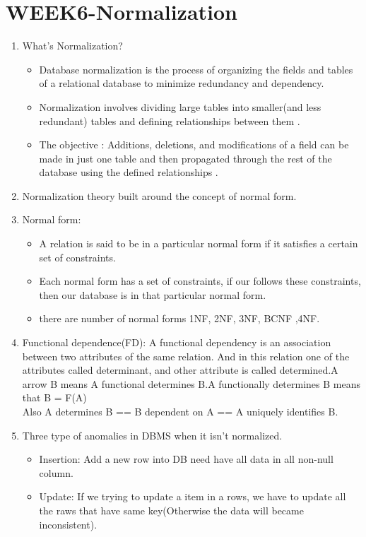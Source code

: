\pagebreak
\section{WEEK6-Normalization}
\begin{enumerate}
    \item What's Normalization? 
    \begin{itemize}
        \item Database normalization is the process of organizing the fields and tables of a relational database to minimize redundancy and dependency.
        \item Normalization involves dividing large tables into smaller(and less redundant) tables and defining relationships between them .
        \item The objective : Additions, deletions, and modifications of a field can be made in just one table and then propagated through the rest of the database using the defined relationships .
    \end{itemize}
    \item Normalization theory built around the concept of normal form.
    \item Normal form:
    \begin{itemize}
        \item A relation is said to be in a particular normal form if it satisfies a certain set of constraints.
        \item Each normal form has a set of constraints, if our follows these constraints, then our database is in that particular normal form.
        \item there are number of normal forms 1NF, 2NF, 3NF, BCNF ,4NF.
    \end{itemize}
    \item Functional dependence(FD):    A functional dependency is an association between two attributes of the same relation. And in this relation one of the attributes called determinant, and other attribute is called determined.A arrow B means A functional determines B.A functionally determines B means that B = F(A)\\
    Also A determines B == B dependent on A == A uniquely identifies B.
    \item Three type of anomalies in DBMS when it isn't normalized.
    \begin{itemize}
        \item Insertion: Add a new row into DB need have all data in all non-null column.
        \item Update: If we trying to update a item in a rows, we have to update all the raws that have same key(Otherwise the data will became inconsistent).

\end{itemize}
\end{enumerate}
